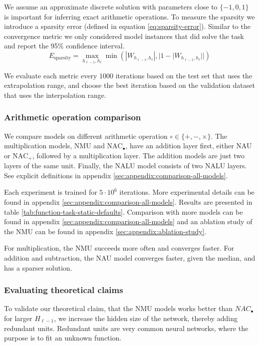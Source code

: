 We assume an approximate discrete solution with parameters close to $\{-1, 0, 1\}$ is important for inferring exact arithmetic operations.
To measure the sparsity we introduce a sparsity error (defined in equation \ref{eq:sparsity-error}).
Similar to the convergence metric we only considered model instances that did solve the task and report the 95\% confidence interval.
\begin{equation}
E_\mathrm{sparsity} = \max_{h_{\ell-1}, h_{\ell}} \min(|W_{h_{\ell-1},h_\ell}|, |1 - |W_{h_{\ell-1},h_\ell}||)
\label{eq:sparsity-error}
\end{equation}

We evaluate each metric every $1000$ iterations based on the test set that uses the extrapolation range, and choose the best iteration based on the validation dataset that uses the interpolation range.

\subsubsection{Arithmetic operation comparison}
We compare models on different arithmetic operation $\circ \in \{+, -, \times\}$. The multiplication models, NMU and $\mathrm{NAC}_{\bullet}$, have an addition layer first, either NAU or $\mathrm{NAC}_{+}$, followed by a multiplication layer. The addition models are just two layers of the same unit. Finally, the NALU model consists of two NALU layers. See explicit definitions in appendix \ref{sec:appendix:comparison-all-models}.

Each experiment is trained for $5 \cdot 10^6$ iterations. More experimental details can be found in appendix \ref{sec:appendix:comparison-all-models}. Results are presented in table \ref{tab:function-task-static-defaults}. Comparison with more models can be found in appendix \ref{sec:appendix:comparison-all-models} and an ablation study of the NMU can be found in appendix \ref{sec:appendix:ablation-study}.

For multiplication, the NMU succeeds more often and converges faster. For addition and subtraction, the NAU model converges faster, given the median, and has a sparser solution.



\subsubsection{Evaluating theoretical claims}

To validate our theoretical claim, that the NMU models works better than $NAC_{\bullet}$ for larger $H_{\ell-1}$, we increase the hidden size of the network, thereby adding redundant units. Redundant units are very common neural networks, where the purpose is to fit an unknown function.%

